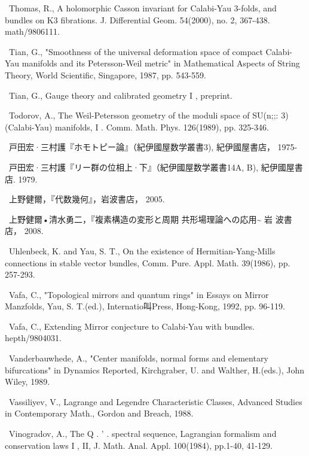 {\noindent [364]\ Thomas, R., A holomorphic Casson invariant for Calabi-Yau 3-folds, and bundles on K3 fibrations. J. Differential Geom. 54(2000), no. 2, 367-438. math/9806111.\par\smallskip
\noindent [365]\ Tian, G., "Smoothness of the universal deformation space of compact Calabi-Yau manifolds and its Petersson-Weil metric" in Mathematical Aspects of String Theory, World Scientific, Singapore, 1987, pp. 543-559.\par\smallskip
\noindent [366]\ Tian, G., Gauge theory and calibrated geometry I , preprint.\par\smallskip
\noindent [367]\ Todorov, A., The Weil-Petersson geometry of the moduli space of SU(n;;: 3) (Calabi-Yau) manifolds, I . Comm. Math. Phys. 126(1989), pp. 325-346.\par\smallskip
\noindent [368]\ 戸田宏·三村護『ホモトピー論』（紀伊國屋数学叢書3), 紀伊國屋書店， 1975-\par\smallskip
\noindent [369]\ 戸田宏·三村護『リー群の位相上·下』（紀伊國屋数学叢書14A, B), 紀伊國屋書 店. 1979.\par\smallskip
\noindent [370]\ 上野健爾，『代数幾何』，岩波書店， 2005.\par\smallskip
\noindent [371]\ 上野健爾•清水勇二，『複素構造の変形と周期 共形場理論への応用\textasciitilde{} 岩 波書店， 2008.\par\smallskip
\noindent [372]\ Uhlenbeck, K. and Yau, S. T., On the existence of Hermitian-Yang-Mills connections in stable vector bundles, Comm. Pure. Appl. Math. 39(1986), pp. 257-293.\par\smallskip
\noindent [373]\ Vafa, C., "Topological mirrors and quantum rings" in Essays on Mirror Manzfolds, Yau, S. T.(ed.), Internatio叫Press, Hong-Kong, 1992, pp. 96-119.\par\smallskip
\noindent [374]\ Vafa, C., Extending Mirror conjecture to Calabi-Yau with bundles. hepth/9804031.\par\smallskip
\noindent [375]\ Vanderbauwhede, A., "Center manifolds, normal forms and elementary bifurcations" in Dynamics Reported, Kirchgraber, U. and Walther, H.(eds.), John Wiley, 1989.\par\smallskip
\noindent [376]\ Vassiliyev, V., Lagrange and Legendre Characteristic Classes, Advanced Studies in Contemporary Math., Gordon and Breach, 1988.\par\smallskip
\noindent [377]\ Vinogradov, A., The Q . ' . spectral sequence, Lagrangian formalism and conservation laws I , II, J. Math. Anal. Appl. 100(1984), pp.1-40, 41-129.\par\smallskip
}
